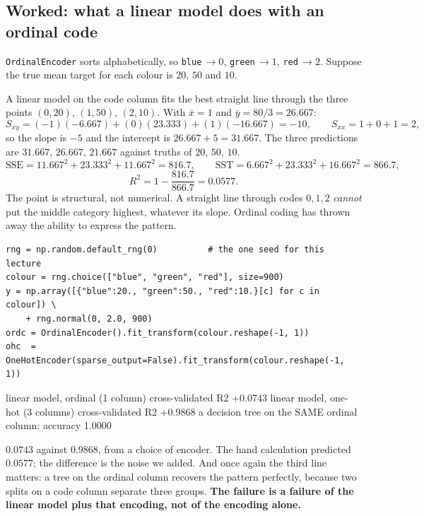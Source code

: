\documentclass[11pt]{article}
\begin{document}
\subsection{Worked: what a linear model does with an ordinal code}
\label{sec:ordinalhand}

\begin{worked}
\texttt{OrdinalEncoder} sorts alphabetically, so \texttt{blue}$\,\to 0$,
\texttt{green}$\,\to 1$, \texttt{red}$\,\to 2$. Suppose the true mean target
for each colour is $20$, $50$ and $10$.

A linear model on the code column fits the best straight line through the
three points $(0, 20)$, $(1, 50)$, $(2, 10)$. With $\bar x = 1$ and
$\bar y = 80/3 = 26.667$:
\[
  S_{xy} = (-1)(-6.667) + (0)(23.333) + (1)(-16.667) = -10,
  \qquad S_{xx} = 1 + 0 + 1 = 2,
\]
so the slope is $-5$ and the intercept is $26.667 + 5 = 31.667$. The three
predictions are $31.667$, $26.667$, $21.667$ against truths of $20$, $50$,
$10$.
\[
  \mathrm{SSE} = 11.667^2 + 23.333^2 + 11.667^2 = 816.7, \qquad
  \mathrm{SST} = 6.667^2 + 23.333^2 + 16.667^2 = 866.7,
\]
\[
  R^2 = 1 - \frac{816.7}{866.7} = 0.0577 .
\]
The point is structural, not numerical. A straight line through codes
$0, 1, 2$ \emph{cannot} put the middle category highest, whatever its slope.
Ordinal coding has thrown away the ability to express the pattern.
\end{worked}

\begin{lstlisting}
rng = np.random.default_rng(0)          # the one seed for this lecture
colour = rng.choice(["blue", "green", "red"], size=900)
y = np.array([{"blue":20., "green":50., "red":10.}[c] for c in colour]) \
    + rng.normal(0, 2.0, 900)
ordc = OrdinalEncoder().fit_transform(colour.reshape(-1, 1))
ohc  = OneHotEncoder(sparse_output=False).fit_transform(colour.reshape(-1, 1))
\end{lstlisting}
\begin{codeout}
linear model, ordinal (1 column)   cross-validated R2 +0.0743
linear model, one-hot (3 columns)  cross-validated R2 +0.9868
a decision tree on the SAME ordinal column: accuracy 1.0000
\end{codeout}

$0.0743$ against $0.9868$, from a choice of encoder. The hand calculation
predicted $0.0577$; the difference is the noise we added. And once again
the third line matters: a tree on the ordinal column recovers the pattern
perfectly, because two splits on a code column separate three groups.
\textbf{The failure is a failure of the linear model plus that encoding, not
of the encoding alone.}
\end{document}
